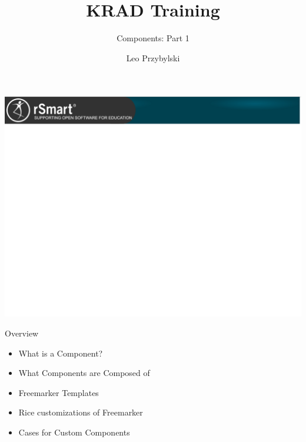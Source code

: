 \documentclass[xcolor=dvipsnames,14pt,professionalfonts]{beamer}
\begin{document}
\title{KRAD Training}
\subtitle{Components: Part 1}
\author[Leo]{Leo Przybylski}

\usebackgroundtemplate%
{%
    \includegraphics[width=\paperwidth,height=\paperheight]{../img/header.png}%
}

{
%
\begin{frame}[plain]
  \titlepage
\end{frame}
}

\begin{frame}{Overview}
  \begin{itemize}
  \item What is a Component?
  \item What Components are Composed of
  \item Freemarker Templates
  \item Rice customizations of Freemarker
  \item Cases for Custom Components
  \end{itemize}
\end{frame}
\end{document}
